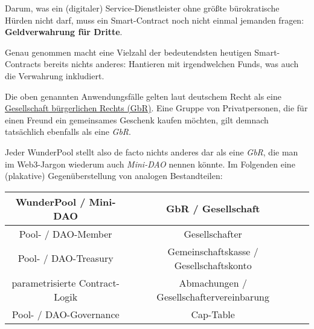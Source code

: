 \vspace{0.3cm}


\begin{Solution*}

Darum, was ein (digitaler) Service-Dienstleister ohne größte bürokratische Hürden nicht darf, muss ein Smart-Contract noch nicht einmal jemanden fragen: \textbf{Geldverwahrung für Dritte}.

\vspace{0.2cm}

Genau genommen macht eine Vielzahl der bedeutendsten heutigen Smart-Contracts bereits nichts anderes: Hantieren mit irgendwelchen Funds, was auch die Verwahrung inkludiert. 

\end{Solution*}

\vspace{0.3cm}



\begin{Konzept*}

Die oben genannten Anwendungsfälle gelten laut deutschem Recht als eine \href{https://de.wikipedia.org/wiki/Gesellschaft_b%C3%BCrgerlichen_Rechts_(Deutschland)}{Gesellschaft bürgerlichen Rechts (GbR)}. Eine Gruppe von Privatpersonen, die für einen Freund ein gemeinsames Geschenk kaufen möchten, gilt demnach tatsächlich ebenfalls als eine \textit{GbR}.

\vspace{0.3cm}

Jeder WunderPool stellt also de facto nichts anderes dar als eine \textit{GbR}, die man im Web3-Jargon wiederum auch \textit{Mini-DAO} nennen könnte. Im Folgenden eine (plakative) Gegenüberstellung von analogen Bestandteilen: 

\vspace{0.5cm}

\begin{tabular}[h]{|c|c|c}
\hline
\textbf{WunderPool / Mini-DAO} & \textbf{GbR / Gesellschaft} \\
\hline
Pool- / DAO-Member & Gesellschafter \\
\hline
Pool- / DAO-Treasury & Gemeinschaftskasse / Gesellschaftskonto \\
\hline
parametrisierte Contract-Logik & Abmachungen / Gesellschaftervereinbarung \\
\hline
Pool- / DAO-Governance & Cap-Table \\
\hline
\end{tabular}

\end{Konzept*}

